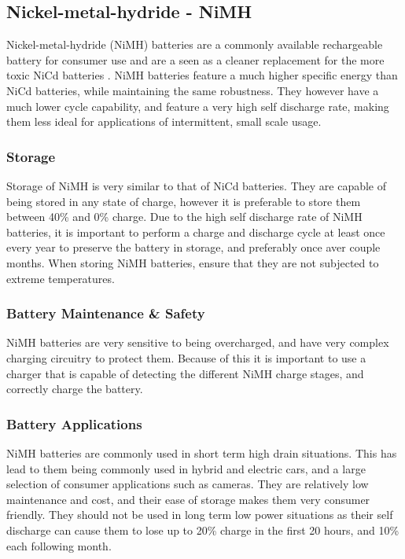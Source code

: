\documentclass[a4paper,11pt, twocolumn]{article}
\begin{document}
\subsection{Nickel-metal-hydride - NiMH}

Nickel-metal-hydride (NiMH) batteries are a commonly available rechargeable battery for consumer use and are a seen as a cleaner replacement for the more toxic NiCd batteries . NiMH batteries feature a much higher specific energy than NiCd batteries, while maintaining the same robustness. They however have a much lower cycle capability, and feature a very high self discharge rate, making them less ideal for applications of intermittent, small scale usage. 

\subsubsection{Storage}

Storage of NiMH is very similar to that of NiCd batteries. They are capable of being stored in any state of charge, however it is preferable to store them between 40\% and 0\% charge. Due to the high self discharge rate of NiMH batteries, it is important to perform a charge and discharge cycle at least once every year to preserve the battery in storage, and preferably once aver couple months. When storing NiMH batteries, ensure that they are not subjected to extreme temperatures.  

\subsubsection{Battery Maintenance \& Safety}

NiMH batteries are very sensitive to being overcharged, and have very complex charging circuitry to protect them. Because of this it is important to use a charger that is capable of detecting the different NiMH charge stages, and correctly charge the battery.

\subsubsection{Battery Applications}

NiMH batteries are commonly used in short term high drain situations. This has lead to them being commonly used in hybrid and electric cars, and a large selection of consumer applications such as cameras. They are relatively low maintenance and cost, and their ease of storage makes them very consumer friendly. They should not be used in long term low power situations as their self discharge can cause them to lose up to 20\% charge in the first 20 hours, and 10\% each following month. 
\end{document}
